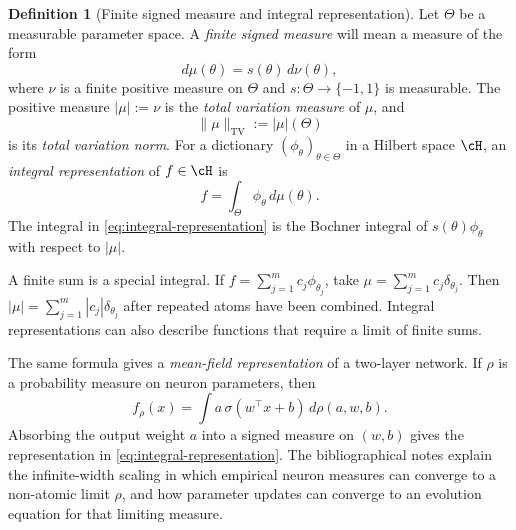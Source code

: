 \documentclass[11pt,twoside]{article}
\newcommand{\TV}{\operatorname{TV}}
\theoremstyle{definition}
\newtheorem{definition}[theorem]{Definition}
\theoremstyle{remark}
\begin{document}
\begin{definition}[Finite signed measure and integral representation]
\label{def:signed-integral-representation}
Let \(\Theta\) be a measurable parameter space. A
\emph{finite signed measure}
will mean a measure of the form
\[
 d\mu(\theta)=s(\theta)\,d\nu(\theta),
\]
where \(\nu\) is a finite positive measure on $\Theta$ and
\(s:\Theta\to\{-1,1\}\) is measurable. The positive measure
\(|\mu|:=\nu\) is the \emph{total variation measure} of \(\mu\), and
\[
 \|\mu\|_{\TV}:=|\mu|(\Theta)
\]
is its \emph{total variation norm}. For a dictionary
\((\phi_\theta)_{\theta\in\Theta}\) in a Hilbert space \(\cH\), an
\emph{integral representation} of \(f\in\cH\) is
\begin{equation}
 f=\int_\Theta \phi_\theta\,d\mu(\theta).
 \label{eq:integral-representation}
\end{equation}
The integral in \cref{eq:integral-representation} is the Bochner integral of
\(s(\theta)\phi_\theta\) with respect to \(|\mu|\).%
\end{definition}

A finite sum is a special integral. If
\(f=\sum_{j=1}^m c_j\phi_{\theta_j}\), take
\(\mu=\sum_{j=1}^m c_j\delta_{\theta_j}\). Then
\(|\mu|=\sum_{j=1}^m|c_j|\delta_{\theta_j}\) after repeated atoms have been
combined. Integral representations can also describe functions that require
a limit of finite sums.

The same formula gives a \emph{mean-field representation} of a two-layer
network. If \(\rho\) is a probability measure on neuron parameters, then
\begin{equation}
 f_\rho(x)=\int a\,\sigma(w^\top x+b)\,d\rho(a,w,b).
 \label{eq:mean-field-representation}
\end{equation}
Absorbing the output weight \(a\) into a signed measure on \((w,b)\) gives
the representation in \cref{eq:integral-representation}. The bibliographical
notes explain the infinite-width scaling in which empirical neuron measures
can converge to a non-atomic limit \(\rho\), and how parameter updates can
converge to an evolution equation for that limiting measure.
\end{document}
